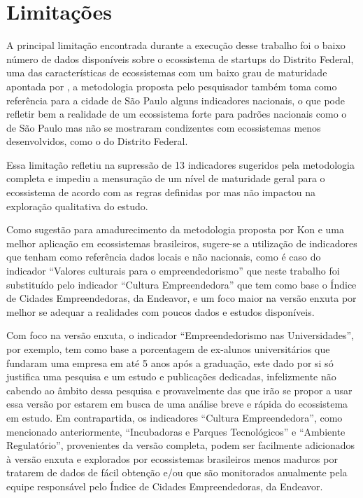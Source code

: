 \section{Limitações}
\label{subsection:limitacoes}

A principal limitação encontrada durante a execução desse trabalho foi o baixo número de dados disponíveis sobre o ecossistema de startups do Distrito Federal, uma das características de ecossistemas com um baixo grau de maturidade apontada por , a metodologia proposta pelo pesquisador também toma como referência para a cidade de São Paulo alguns indicadores nacionais, o que pode refletir bem a realidade de um ecossistema forte para padrões nacionais como o de São Paulo mas não se mostraram condizentes com ecossistemas menos desenvolvidos, como o do Distrito Federal.

Essa limitação refletiu na supressão de 13 indicadores sugeridos pela metodologia completa e impediu a mensuração de um nível de maturidade geral para o ecossistema de acordo com as regras definidas por  mas não impactou na exploração qualitativa do estudo.

Como sugestão para amadurecimento da metodologia proposta por Kon e uma melhor aplicação em ecossistemas brasileiros, sugere-se a utilização de indicadores que tenham como referência dados locais e não nacionais, como é caso do indicador ``Valores culturais para o empreendedorismo'' que neste trabalho foi substituído pelo indicador ``Cultura Empreendedora'' que tem como base o Índice de Cidades Empreendedoras, da Endeavor, e um foco maior na versão enxuta por melhor se adequar a realidades com poucos dados e estudos disponíveis. 

Com foco na versão enxuta, o indicador ``Empreendedorismo nas Universidades'', por exemplo, tem como base a porcentagem de ex-alunos universitários que fundaram uma empresa em até 5 anos após a graduação, este dado por si só justifica uma pesquisa e um estudo e publicações dedicadas, infelizmente não cabendo ao âmbito dessa pesquisa e provavelmente das que irão se propor a usar essa versão por estarem em busca de uma análise breve e rápida do ecossistema em estudo. Em contrapartida, os indicadores ``Cultura Empreendedora'', como mencionado anteriormente, ``Incubadoras e Parques Tecnológicos'' e ``Ambiente Regulatório'', provenientes da versão completa, podem ser facilmente adicionados à versão enxuta e explorados por ecossistemas brasileiros menos maduros por tratarem de dados de fácil obtenção e/ou que são monitorados anualmente pela equipe responsável pelo Índice de Cidades Empreendedoras, da Endeavor.


